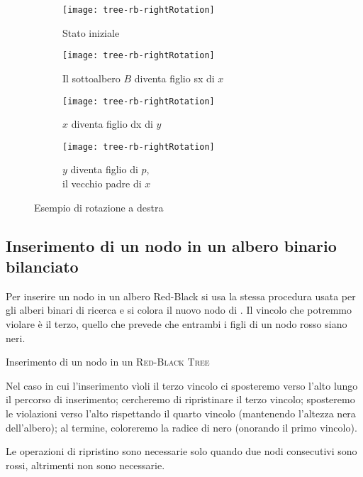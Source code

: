 \begin{figure}[H]
	\renewcommand\thesubfigure{\arabic{subfigure}}
	\begin{subfigure}[t]{.23\linewidth}
		\texttt{[image: tree-rb-rightRotation]}
		\caption{Stato iniziale}
	\end{subfigure}\hfill
	\begin{subfigure}[t]{.23\linewidth}
		\texttt{[image: tree-rb-rightRotation]}
		\caption{Il sottoalbero \(B\) diventa figlio sx di \(x\)}
	\end{subfigure}\hfill
	\begin{subfigure}[t]{.23\linewidth}
		\texttt{[image: tree-rb-rightRotation]}
		\caption{\(x\) diventa figlio dx di \(y\)}
	\end{subfigure}\hfill
	\begin{subfigure}[t]{.23\linewidth}
		\texttt{[image: tree-rb-rightRotation]}
		\caption{\(y\) diventa figlio di \(p\),\\il vecchio padre di \(x\)}
	\end{subfigure}
	\caption{Esempio di rotazione a destra}
\end{figure}

\clearpage
\subsection*{Inserimento di un nodo in un albero binario bilanciato}

Per inserire un nodo in un albero Red-Black si usa la stessa procedura usata per gli alberi binari di ricerca e si colora il nuovo nodo di \RED.
Il vincolo che potremmo violare è il terzo, quello che prevede che entrambi i figli di un nodo rosso siano neri.

\begin{algorithm}[H]
	\caption{Inserimento di un nodo in un \textsc{Red-Black Tree}}
	
\end{algorithm}

Nel caso in cui l'inserimento vìoli il terzo vincolo ci sposteremo verso l'alto lungo il percorso di inserimento;
cercheremo di ripristinare il terzo vincolo;
sposteremo le violazioni verso l'alto rispettando il quarto vincolo (mantenendo l'altezza nera dell'albero);
al termine, coloreremo la radice di nero (onorando il primo vincolo).

\begin{note}
Le operazioni di ripristino sono necessarie solo quando due nodi consecutivi sono rossi, altrimenti non sono necessarie.
\end{note}


